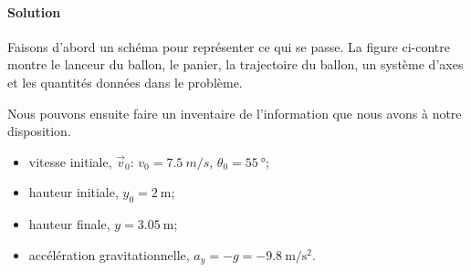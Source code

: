 \paragraph{Solution}
Faisons d'abord un schéma pour représenter ce qui se passe.  La figure
ci-contre montre le lanceur du ballon, le panier, la trajectoire du ballon, un
système d'axes et les quantités données dans le problème.

Nous pouvons ensuite faire un inventaire de l'information que nous avons à
notre disposition.

\begin{itemize}
  \item vitesse initiale, $\vec{v}_0$: $v_0 = \SI{7.5}{m/s}$,
    $\theta_0 = \SI{55}{\degree}$;
  \item hauteur initiale, $y_0 = \SI{2}{\meter}$;
  \item hauteur finale, $y = \SI{3.05}{\meter}$;
  \item accélération gravitationnelle, $a_y =
    -g = \SI{-9.8}{\meter\per\second\squared}$.
\end{itemize}

